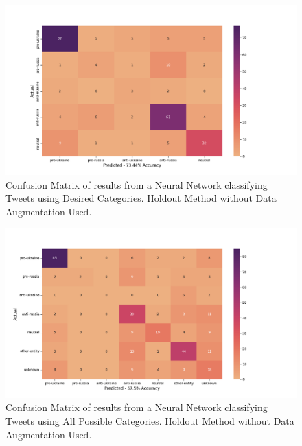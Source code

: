 \documentclass[12pt,letterpaper,oneside,titlepage]{article}
\begin{document}
\begin{figure}[ht]
    \centering
    \includegraphics[scale=0.67]{nn-5}
    \captionsetup{justification=centering}
    \caption{Confusion Matrix of results from a Neural Network classifying Tweets using Desired Categories. Holdout Method without Data Augmentation Used.}
\end{figure}
\FloatBarrier

\begin{figure}[ht]
    \centering
    \includegraphics[scale=0.67]{nn-7}
    \captionsetup{justification=centering}
    \caption{Confusion Matrix of results from a Neural Network classifying Tweets using All Possible Categories. Holdout Method without Data Augmentation Used.}
\end{figure}
\FloatBarrier
\end{document}
